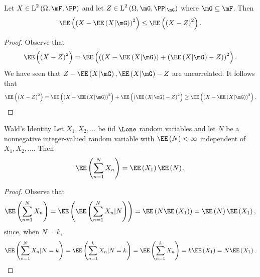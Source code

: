 \documentclass[stat901]{subfiles}
\begin{document}
    \rruleline
    
    \begin{theorem}{}
        Let $X\in\LLL^2\left( \Omega,\mF,\PP \right)$ and let $Z\in\LLL^2\left( \Omega,\mG,\PP|_{\mG} \right)$ where $\mG\subseteq\mF$. Then
        \begin{equation*}
            \EE\left( \left( X-\EE\left( X|\mG \right) \right)^{2} \right) \leq \EE\left( \left( X-Z \right)^{2} \right).
        \end{equation*}
    \end{theorem}

    \begin{proof}
        Observe that
        \begin{equation*}
            \EE\left( \left( X-Z \right)^{2} \right) = \EE\left( \left( \left( X-\EE\left( X|\mG \right) \right) + \left( \EE\left( X|\mG \right)-Z \right) \right)^{2} \right).
        \end{equation*}
        We have seen that $Z-\EE\left( X|\mG \right), \EE\left( X|\mG \right)-Z$ are uncorrelated. It follows that
        \begin{equation*}
            \EE\left( \left( X-Z \right)^{2} \right) = \EE\left( \left( X-\EE\left( X|\mG \right) \right)^{2} \right) + \EE\left( \left( \EE\left( X|\mG \right)-Z \right)^{2} \right) \geq \EE\left( \left( X-\EE\left( X|\mG \right) \right)^{2} \right).
        \end{equation*}
    \end{proof}

    \begin{cor}{Wald's Identity}
        Let $X_1,X_2,\ldots$ be iid $\Lone$ random variables and let $N$ be a nonnegative integer-valued random variable with $\EE\left( N \right)<\infty$ independent of $X_1,X_2,\ldots$. Then
        \begin{equation*}
            \EE\left( \sum^{N}_{n=1}X_n \right) = \EE\left( X_1 \right)\EE\left( N \right).
        \end{equation*}
    \end{cor}

    \begin{proof}
        Observe that
        \begin{equation*}
            \EE\left( \sum^{N}_{n=1}X_n \right) = \EE\left( \EE\left( \sum^{N}_{n=1}X_n|N \right) \right) = \EE\left( N\EE\left( X_1 \right) \right) = \EE\left( N \right)\EE\left( X_1 \right),
        \end{equation*}
        since, when $N=k$,
        \begin{equation*}
            \EE\left( \sum^{N}_{n=1}X_n|N=k \right) = \EE\left( \sum^{k}_{n=1}X_n |N=k \right) = \EE\left( \sum^{k}_{n=1}X_n \right) = k\EE\left( X_1 \right) = N\EE\left( X_1 \right).
        \end{equation*}
    \end{proof}
    
\end{document}

